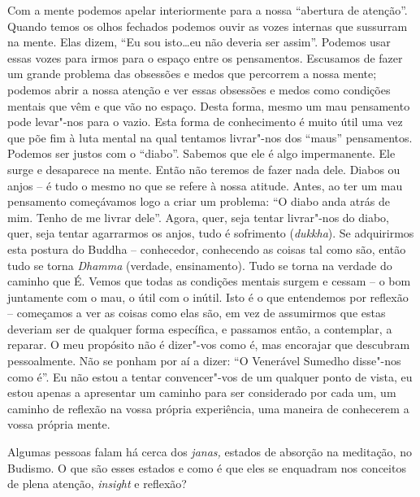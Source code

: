 Com a mente podemos apelar interiormente para a nossa ``abertura de
atenção''. Quando temos os olhos fechados podemos ouvir as vozes
internas que sussurram na mente. Elas dizem, ``Eu sou isto\ldots{}eu não
deveria ser assim''. Podemos usar essas vozes para irmos para o espaço
entre os pensamentos. Escusamos de fazer um grande problema das
obsessões e medos que percorrem a nossa mente; podemos abrir a nossa
atenção e ver essas obsessões e medos como condições mentais que vêm e
que vão no espaço. Desta forma, mesmo um mau pensamento pode levar"-nos
para o vazio. Esta forma de conhecimento é muito útil uma vez que põe
fim à luta mental na qual tentamos livrar"-nos dos ``maus'' pensamentos.
Podemos ser justos com o ``diabo''. Sabemos que ele é algo impermanente.
Ele surge e desaparece na mente. Então não teremos de fazer nada dele.
Diabos ou anjos -- é tudo o mesmo no que se refere à nossa atitude.
Antes, ao ter um mau pensamento começávamos logo a criar um problema:
``O diabo anda atrás de mim. Tenho de me livrar dele''. Agora, quer,
seja tentar livrar"-nos do diabo, quer, seja tentar agarrarmos os anjos,
tudo é sofrimento (\emph{dukkha}). Se adquirirmos esta postura do Buddha
-- conhecedor, conhecendo as coisas tal como são, então tudo se torna
\emph{Dhamma} (verdade, ensinamento). Tudo se torna na verdade do
caminho que É. Vemos que todas as condições mentais surgem e cessam -- o
bom juntamente com o mau, o útil com o inútil. Isto é o que entendemos
por reflexão -- começamos a ver as coisas como elas são, em vez de
assumirmos que estas deveriam ser de qualquer forma específica, e
passamos então, a contemplar, a reparar. O meu propósito não é dizer"-vos
como é, mas encorajar que descubram pessoalmente. Não se ponham por aí a
dizer: ``O Venerável Sumedho disse"-nos como é''. Eu não estou a tentar
convencer"-vos de um qualquer ponto de vista, eu estou apenas a
apresentar um caminho para ser considerado por cada um, um caminho de
reflexão na vossa própria experiência, uma maneira de conhecerem a vossa
própria mente.

\bigskip

 Algumas pessoas falam há cerca dos \emph{janas,} estados de
absorção na meditação, no Budismo. O que são esses estados e como é que
eles se enquadram nos conceitos de plena atenção, \emph{insight} e
reflexão?

